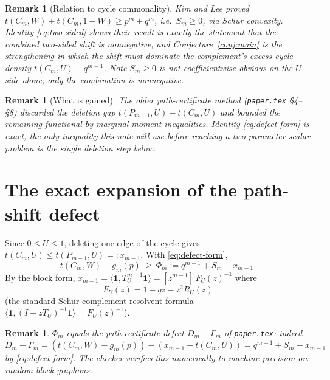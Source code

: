 \documentclass[11pt]{article}
\newtheorem{remark}[theorem]{Remark}
\newcommand{\one}{\mathbf 1}
\newcommand{\ip}[2]{\langle #1,#2\rangle}
\begin{document}
\begin{remark}[Relation to cycle commonality]
Kim and Lee \cite{KimLee} proved $t(C_m,W)+t(C_m,1-W)\ge p^m+q^m$, i.e.\ $S_m\ge0$, via Schur convexity.  Identity \eqref{eq:two-sided} shows their result is exactly the statement that the combined two-sided shift is nonnegative, and Conjecture~\ref{conj:main} is the strengthening in which the shift must dominate the complement's excess cycle density $t(C_m,U)-q^{m-1}$.  Note $S_m\ge0$ is \emph{not} coefficientwise obvious on the $U$-side alone; only the combination is nonnegative.
\end{remark}

\begin{remark}[What is gained]
The older path-certificate method (\texttt{paper.tex} \S4--\S8) discarded the deletion gap $t(P_{m-1},U)-t(C_m,U)$ \emph{and} bounded the remaining functional by marginal moment inequalities.  Identity \eqref{eq:defect-form} is exact; the only inequality this note will use before reaching a two-parameter scalar problem is the single deletion step below.
\end{remark}

\section{The exact expansion of the path-shift defect}\label{sec:expansion}

Since $0\le U\le1$, deleting one edge of the cycle gives $t(C_m,U)\le t(P_{m-1},U)=:x_{m-1}$.  With \eqref{eq:defect-form},
\begin{equation}\label{eq:Phi-def}
        t(C_m,W)-g_m(p)\ \ge\ \Phi_m:=q^{m-1}+S_m-x_{m-1}.
\end{equation}
By the block form, $x_{m-1}=\ip{\one}{T_U^{m-1}\one}=[z^{m-1}]\,F_U(z)^{-1}$ where
\[
        F_U(z)=1-qz-z^2R_U(z)
\]
(the standard Schur-complement resolvent formula $\ip{\one}{(I-zT_U)^{-1}\one}=F_U(z)^{-1}$).

\begin{remark}
$\Phi_m$ equals the path-certificate defect $D_m-\Gamma_m$ of \texttt{paper.tex}: indeed $D_m-\Gamma_m=(t(C_m,W)-g_m(p))-(x_{m-1}-t(C_m,U))=q^{m-1}+S_m-x_{m-1}$ by \eqref{eq:defect-form}.  The checker verifies this numerically to machine precision on random block graphons.
\end{remark}
\end{document}
